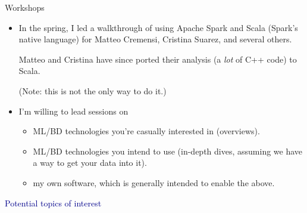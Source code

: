 \documentclass{beamer}
\begin{document}
\begin{frame}{Workshops}
\vspace{0.5 cm}
\begin{itemize}\setlength{\itemsep}{0.75 cm}
\item In the spring, I led a walkthrough of using Apache Spark and Scala (Spark's native language) for Matteo Cremensi, Cristina Suarez, and several others.

\vspace{0.25 cm}
Matteo and Cristina have since ported their analysis (a {\it lot} of C++ code) to Scala.

\vspace{0.25 cm}
(Note: this is not the only way to do it.)

\item I'm willing to lead sessions on
\begin{itemize}
\item ML/BD technologies you're casually interested in (overviews).
\item ML/BD technologies you intend to use (in-depth dives, assuming we have a way to get your data into it).
\item my own software, which is generally intended to enable the above.
\end{itemize}
\end{itemize}
\end{frame}

\begin{frame}{}
\begin{center}
\Huge \textcolor{darkblue}{Potential topics of interest}
\end{center}
\end{frame}
\end{document}
